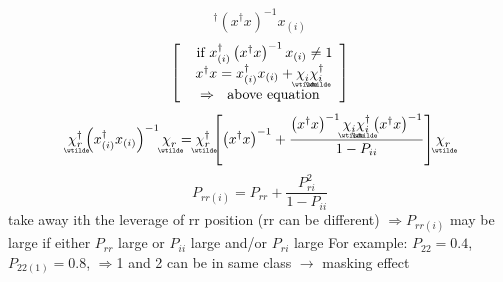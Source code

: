 \documentclass{article}
\begin{document}
\begin{itemize}
\begin{equation*}
{{}^{\dagger }\left( x^{\dagger }x\right) ^{-1}x_{\left( i\right) }}
\end{equation*}%
\begin{equation*}
\left[ 
\begin{array}{c}
\text{if }x_{\left( i\right) }^{\dagger }\left( x^{\dagger }x\right)
^{-1}x_{\left( i\right) }\neq 1 \\ 
x^{\dagger }x=x_{\left( i\right) }^{\dagger }x_{\left( i\right) }+%
\underaccent{\wtilde}{\chi}%
_{i}%
\underaccent{\wtilde}{\chi}%
_{i}^{\dagger } \\ 
\Rightarrow \text{above equation}%
\end{array}%
\right]
\end{equation*}%
\begin{equation*}
\underaccent{\wtilde}{\chi}%
_{r}^{\dagger }\left( x_{\left( i\right) }^{\dagger }x_{\left( i\right)
}\right) ^{-1}%
\underaccent{\wtilde}{\chi}%
_{r}=%
\underaccent{\wtilde}{\chi}%
_{r}^{\dagger }\left[ \left( x^{\dagger }x\right) ^{-1}+\frac{\left(
x^{\dagger }x\right) ^{-1}%
\underaccent{\wtilde}{\chi}%
_{i}%
\underaccent{\wtilde}{\chi}%
_{i}^{\dagger }\left( x^{\dagger }x\right) ^{-1}}{1-P_{ii}}\right] 
\underaccent{\wtilde}{\chi}%
_{r}
\end{equation*}%
\begin{equation*}
P_{rr\left( i\right) }=P_{rr}+\frac{P_{ri}^{2}}{1-P_{ii}}
\end{equation*}%
take away ith the leverage of rr position (rr can be different)\newline
$\Longrightarrow P_{rr\left( i\right) }$ may be large if either $P_{rr}$
large or $P_{ii}$ large and/or $P_{ri}$ large\newline
For example: $P_{22}=0.4$, $P_{22\left( 1\right) }=0.8$, $\Rightarrow $1 and
2 can be in same class $\rightarrow $ masking effect
\end{itemize}
\end{document}
